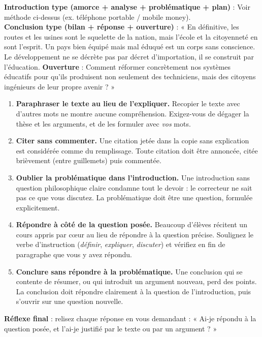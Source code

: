\documentclass[11pt]{article}
\begin{document}
\begin{exoresolu}
\begin{itemize}
\end{itemize}
\textbf{Introduction type (amorce + analyse + problématique + plan)} : Voir méthode ci-dessus (ex. téléphone portable / mobile money).\\
\textbf{Conclusion type (bilan + réponse + ouverture)} : « En définitive, les routes et les usines sont le squelette de la nation, mais l'école et la citoyenneté en sont l'esprit. Un pays bien équipé mais mal éduqué est un corps sans conscience. Le développement ne se décrète pas par décret d'importation, il se construit par l'éducation. \textbf{Ouverture} : Comment réformer concrètement nos systèmes éducatifs pour qu'ils produisent non seulement des techniciens, mais des citoyens ingénieurs de leur propre avenir ? »
\end{exoresolu}

\begin{attention}
\begin{enumerate}
\item \textbf{Paraphraser le texte au lieu de l'expliquer.} Recopier le texte avec d'autres mots ne montre aucune compréhension. Exigez-vous de dégager la thèse et les arguments, et de les formuler avec \emph{vos} mots.
\item \textbf{Citer sans commenter.} Une citation jetée dans la copie sans explication est considérée comme du remplissage. Toute citation doit être annoncée, citée brièvement (entre guillemets) puis commentée.
\item \textbf{Oublier la problématique dans l'introduction.} Une introduction sans question philosophique claire condamne tout le devoir : le correcteur ne sait pas ce que vous discutez. La problématique doit être une question, formulée explicitement.
\item \textbf{Répondre à côté de la question posée.} Beaucoup d'élèves récitent un cours appris par cœur au lieu de répondre à la question précise. Soulignez le verbe d'instruction (\emph{définir}, \emph{expliquer}, \emph{discuter}) et vérifiez en fin de paragraphe que vous y avez répondu.
\item \textbf{Conclure sans répondre à la problématique.} Une conclusion qui se contente de résumer, ou qui introduit un argument nouveau, perd des points. La conclusion doit répondre clairement à la question de l'introduction, puis s'ouvrir sur une question nouvelle.
\end{enumerate}
\textbf{Réflexe final} : relisez chaque réponse en vous demandant : « Ai-je répondu à la question posée, et l'ai-je justifié par le texte ou par un argument ? »
\end{attention}
\end{document}

